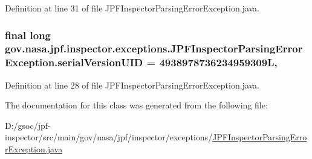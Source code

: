 Definition at line 31 of file J\+P\+F\+Inspector\+Parsing\+Error\+Exception.\+java.

\subsubsection[{\texorpdfstring{serial\+Version\+U\+ID}{serialVersionUID}}]{\setlength{\rightskip}{0pt plus 5cm}final long gov.\+nasa.\+jpf.\+inspector.\+exceptions.\+J\+P\+F\+Inspector\+Parsing\+Error\+Exception.\+serial\+Version\+U\+ID = 4938978736234959309L\hspace{0.3cm}{\ttfamily [static]}, {\ttfamily [private]}}\hypertarget{classgov_1_1nasa_1_1jpf_1_1inspector_1_1exceptions_1_1_j_p_f_inspector_parsing_error_exception_a603dce023e298bc1978739f08fd2b9ac}{}\label{classgov_1_1nasa_1_1jpf_1_1inspector_1_1exceptions_1_1_j_p_f_inspector_parsing_error_exception_a603dce023e298bc1978739f08fd2b9ac}


Definition at line 28 of file J\+P\+F\+Inspector\+Parsing\+Error\+Exception.\+java.



The documentation for this class was generated from the following file\+:\begin{DoxyCompactItemize}
\item 
D\+:/gsoc/jpf-\/inspector/src/main/gov/nasa/jpf/inspector/exceptions/\hyperlink{_j_p_f_inspector_parsing_error_exception_8java}{J\+P\+F\+Inspector\+Parsing\+Error\+Exception.\+java}\end{DoxyCompactItemize}
